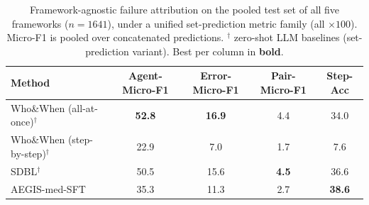 \begin{table}[t]
\centering
\caption{Framework-agnostic failure attribution on the pooled test set of all five frameworks ($n{=}1641$), under a unified set-prediction metric family (all $\times100$). Micro-F1 is pooled over concatenated predictions. $^\dagger$ zero-shot LLM baselines (set-prediction variant). Best per column in \textbf{bold}.}
\label{tab:agnostic-main}
\begin{tabular}{lcccc}
\toprule
Method & Agent-Micro-F1 & Error-Micro-F1 & Pair-Micro-F1 & Step-Acc \\
\midrule
Who\&When (all-at-once)$^\dagger$ & \textbf{52.8} & \textbf{16.9} & 4.4 & 34.0 \\
Who\&When (step-by-step)$^\dagger$ & 22.9 & 7.0 & 1.7 & 7.6 \\
SDBL$^\dagger$ & 50.5 & 15.6 & \textbf{4.5} & 36.6 \\
AEGIS-med-SFT & 35.3 & 11.3 & 2.7 & \textbf{38.6} \\
\bottomrule
\end{tabular}
\end{table}
